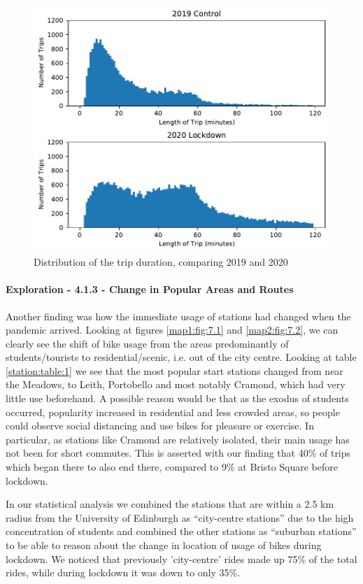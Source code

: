 \documentclass[11pt,a4paper]{article}
\begin{document}
\begin{figure}[H]
  \centering
  \includegraphics{report/6}
  \caption{Distribution of the trip duration, comparing 2019 and 2020}
  \label{duration:fig:6}
\end{figure}



\paragraph{Exploration - 4.1.3 - Change in Popular Areas and Routes}
Another finding was how the immediate usage of stations had changed when the pandemic arrived. Looking at figures \ref{map1:fig:7.1} and \ref{map2:fig:7.2}, we can clearly see the shift of bike usage from the areas predominantly of students/tourists to residential/scenic, i.e. out of the city centre. 
Looking at table \ref{station:table:1} we see that the most popular start stations changed from near the Meadows, to Leith, Portobello and most notably Cramond, which had very little use beforehand. A possible reason would be that as the exodus of students occurred, popularity increased in residential and less crowded areas, so people could observe social distancing and use bikes for pleasure or exercise. In particular, as stations like Cramond are relatively isolated, their main usage has not been for short commutes. This is asserted with our finding that 40\% of trips which began there to also end there, compared to 9\% at Bristo Square before lockdown.

In our statistical analysis we combined the stations that are within a 2.5 km radius from the University of Edinburgh as “city-centre stations” due to the high concentration of students and combined the other stations as “suburban stations” to be able to reason about the change in location of usage of bikes during lockdown. We noticed that previously 'city-centre' rides made up 75\% of the total rides, while during lockdown it was down to only 35\%. 
\end{document}
